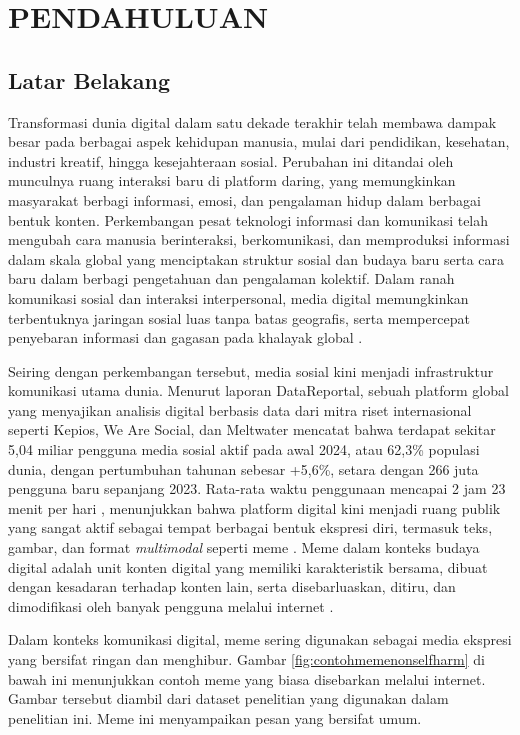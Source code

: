 ﻿\newpage
\pagestyle{fancy}
\fancyhf{}
\fancyhead[R]{\thepage}
\chapter{PENDAHULUAN} \label{Bab I}

\section{Latar Belakang} \label{I.Latar Belakang}
Transformasi dunia digital dalam satu dekade terakhir telah membawa dampak besar pada berbagai aspek kehidupan manusia, mulai dari pendidikan, kesehatan, industri kreatif, hingga kesejahteraan sosial. Perubahan ini ditandai oleh munculnya ruang interaksi baru di platform daring, yang memungkinkan masyarakat berbagi informasi, emosi, dan pengalaman hidup dalam berbagai bentuk konten. Perkembangan pesat teknologi informasi dan komunikasi telah mengubah cara manusia berinteraksi, berkomunikasi, dan memproduksi informasi dalam skala global yang menciptakan struktur sosial dan budaya baru serta cara baru dalam berbagi pengetahuan dan pengalaman kolektif. Dalam ranah komunikasi sosial dan interaksi interpersonal, media digital memungkinkan terbentuknya jaringan sosial luas tanpa batas geografis, serta mempercepat penyebaran informasi dan gagasan pada khalayak global \cite{SyakhraniWidijatmoko2024}. 

Seiring dengan perkembangan tersebut, media sosial kini menjadi infrastruktur komunikasi utama dunia. Menurut laporan DataReportal, sebuah platform global yang menyajikan analisis digital berbasis data dari mitra riset internasional seperti Kepios, We Are Social, dan Meltwater mencatat bahwa terdapat sekitar 5,04 miliar pengguna media sosial aktif pada awal 2024, atau 62,3\% populasi dunia, dengan pertumbuhan tahunan sebesar +5,6\%, setara dengan 266 juta pengguna baru sepanjang 2023. Rata-rata waktu penggunaan mencapai 2 jam 23 menit per hari , menunjukkan bahwa platform digital kini menjadi ruang publik yang sangat aktif sebagai tempat berbagai bentuk ekspresi diri, termasuk teks, gambar, dan format \textit{multimodal} seperti meme \cite{datareportal2024_global}\cite {datareportal2024_5billion}. Meme dalam konteks budaya digital adalah unit konten digital yang memiliki karakteristik bersama, dibuat dengan kesadaran terhadap konten lain, serta disebarluaskan, ditiru, dan dimodifikasi oleh banyak pengguna melalui internet \cite{shifman2013memes}. 

Dalam konteks komunikasi digital, meme sering digunakan sebagai media ekspresi yang bersifat ringan dan menghibur. Gambar \ref{fig:contohmemenonselfharm} di bawah ini menunjukkan contoh meme yang biasa disebarkan melalui internet. Gambar tersebut diambil dari dataset penelitian yang digunakan dalam penelitian ini. Meme ini menyampaikan pesan yang bersifat umum. 

